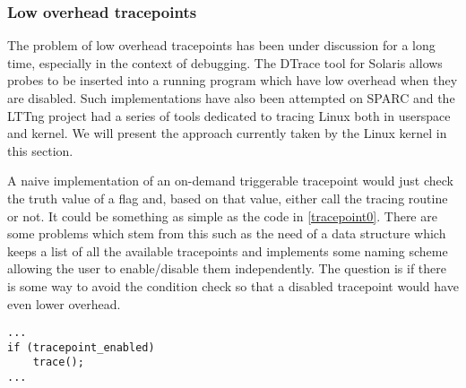 \subsubsection{Low overhead tracepoints}
\label{subsubsection:lowoverheadtracepoints}

The problem of low overhead tracepoints has been under discussion for a long time, especially in the context of debugging. The DTrace tool for Solaris allows probes to be inserted into a running program which have low overhead when they are disabled\cite{Cantrill04}. Such implementations have also been attempted on SPARC\cite{Kessler90} and the LTTng project had a series of tools dedicated to tracing Linux both in userspace and kernel\cite{Desnoyers09}. We will present the approach currently taken by the Linux kernel in this section.

A naive implementation of an on-demand triggerable tracepoint would just check the truth value of a flag and, based on that value, either call the tracing routine or not. It could be something as simple as the code in \ref{tracepoint0}. There are some problems which stem from this such as the need of a data structure which keeps a list of all the available tracepoints and implements some naming scheme allowing the user to enable/disable them independently. The question is if there is some way to avoid the condition check so that a disabled tracepoint would have even lower overhead.
\begin{lstlisting}[label=tracepoint0,caption=Naive tracepoint implementation]
...
if (tracepoint_enabled)
	trace();
...
\end{lstlisting}

